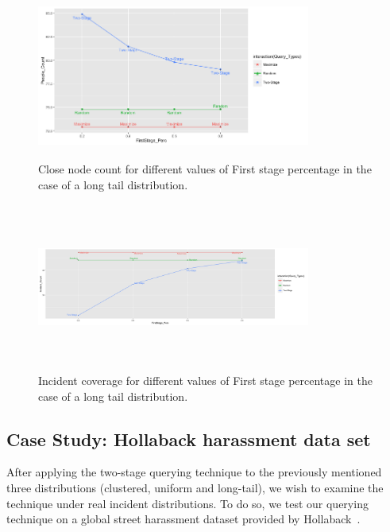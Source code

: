 \documentclass{acm_proc_article-sp}
\begin{document}
\begin{figure}[!h]
\centering
 \includegraphics[width=9cm ,height=5.5cm]{figuresPng/LT-closePeople.png}
 \caption{Close node count for different values of First stage percentage in the case of a long tail distribution. }
 \label{fig:LTClosePeople}
\end{figure}

\begin{figure}[!h]
\centering
 \includegraphics[width=9cm ,height=5.5cm]{figuresPng/LT-incidCov.png}
 \caption{Incident coverage for different values of First stage percentage in the case of a long tail distribution. }
 \label{fig:LTIncdCove}
\end{figure}



\subsection{Case Study: Hollaback harassment data set}
After applying the two-stage querying technique to the previously mentioned three distributions (clustered, uniform and long-tail), we wish to examine the technique under real incident distributions. To do so, we test our querying technique on a global street harassment dataset provided by Hollaback~\cite{hollaback}.
\end{document}
